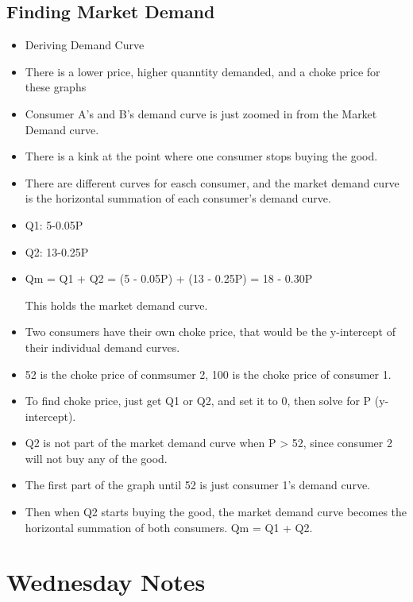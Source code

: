 \documentclass{article}
\begin{document}
\subsection{Finding Market Demand}
\begin{itemize}
  \item Deriving Demand Curve
  \item There is a lower price, higher quanntity demanded,
    and a choke price for these graphs
  \item Consumer A's and B's demand curve is just zoomed in from the Market Demand curve.
  \item There is a kink at the point where one consumer stops buying the good.
  \item There are different curves for easch consumer, and the market demand curve
    is the horizontal summation of each consumer's demand curve.
  \item Q1: 5-0.05P
  \item Q2: 13-0.25P
  \item Qm = Q1 + Q2 = (5 - 0.05P) + (13 - 0.25P) = 18 - 0.30P

    This holds the market demand curve.
  \item Two consumers have their own choke price, that would be the y-intercept
    of their individual demand curves.
  \item 52 is the choke price of conmsumer 2, 100 is the choke price of consumer 1.
  \item To find choke price, just get Q1 or Q2, and set it to 0, then solve for P (y-intercept).
  \item Q2 is not part of the market demand curve when P > 52,
    since consumer 2 will not buy any of the good.
  \item The first part of the graph until 52 is just consumer 1's demand curve.
  \item Then when Q2 starts buying the good, the market demand curve
    becomes the horizontal summation of both consumers. Qm = Q1 + Q2.
\end{itemize}


\newpage
\section{Wednesday Notes}
\end{document}

